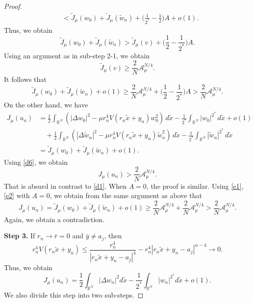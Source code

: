 \documentclass[10pt,a4paper]{amsart}
\numberwithin{equation}{section}
\begin{document}
\begin{proof}
\begin{align*}
 &<\tilde{J}_\mu(w_0)+\tilde{J}_\mu( \tilde{w}_n)
  +\Big( \frac{1}{2^*}-\frac{1}{2}\Big) A+o(1).
 \end{align*}
Thus, we obtain
\[
 \tilde{J}_\mu(w_0)+\tilde{J}_\mu( \tilde{w}_n)>\tilde{J}_\mu(v)
 + \Big( \frac{1}{2}-\frac{1}{2^*}\Big) A.
 \]
Using an argument as in sub-step 2-1, we obtain
\[
 \tilde{J}_\mu(v)\geq \frac{2}{N}\mathcal{A}_{\mu}^{N/4}.
\]
It follows that
\begin{equation}\label{d6}
 \tilde{J}_\mu(w_0)+\tilde{J}_\mu( \tilde{w}_n)+o(1)
 \geq \frac{2}{N}\mathcal{A}_{\mu}^{N/4}
 + \Big( \frac{1}{2}-\frac{1}{2^*}\Big) A> \frac{2}{N}\mathcal{A}_{\mu}^{N/4}.
\end{equation}
On the other hand, we have
 \begin{align*}
 J_\mu(u_n)
 &=\frac{1}{2}\int_{\mathbb{R}^N}\left(|\Delta w_0|^2-\mu r_n^4V(r_n\tilde{x}+y_n)w_0^2\right)\,d\tilde{x}-\frac{1}{2^*}\int _{\mathbb{R}^N}|w_0|^{2^*}\,d\tilde{x}+o(1)\\
 &\quad +\frac{1}{2}\int_{\mathbb{R}^N}\left(|\Delta \tilde{w}_n|^2-\mu r_n^4V(r_n\tilde{x}+y_n) \tilde{w}_n^2\right)\,d\tilde{x}-\frac{1}{2^*}\int _{\mathbb{R}^N}| \tilde{w}_n|^{2^*}\,d\tilde{x}\\
 &=\tilde{J}_\mu(w_0)+\tilde{J}_\mu( \tilde{w}_n)+o(1).
 \end{align*}
 Using \eqref{d6}, we obtain
 \[
 J_\mu(u_n)> \frac{2}{N}\mathcal{A}_{\mu}^{N/4}.
 \]
 That is absurd in contrast to \eqref{d1}. When $A=0$, the proof is similar. 
 Using \eqref{e1}, \eqref{e2} with $A=0$, we obtain from the same argument as 
 above that
 \[
 J_\mu(u_n)=\tilde{J}_\mu(w_0)+\tilde{J}_\mu( \tilde{w}_n)+o(1)\geq \frac{2}{N}\mathcal{A}_{\mu}^{N/4}+\frac{2}{N}\mathcal{A}_{\mu}^{N/4}>\frac{2}{N}\mathcal{A}_{\mu}^{N/4}.
 \]
Again, we obtain a contradiction. 
\smallskip

\noindent\textbf{Step 3.} If \(r_n\to \bar{r}=0\) and \(\bar {y}\neq a_j\), then
\[
 r_n^4V(r_n\tilde{x}+y_n)\leq \frac{r_n^4}{\left|r_n\tilde{x}
 +y_n-a_j\right| ^4 }-r_n^4\left|r_n\tilde{x}+y_n-a_j\right|^{\alpha-4}\to 0.
 \]
Thus, we obtain
\begin{equation}\label{b1}
 J_\mu(u_n)=\frac{1}{2}\int_{\mathbb{R}^N}|\Delta {w}_n|^2d\tilde{x}
 -\frac{1}{2^*}\int _{\mathbb{R}^N}|{w}_n|^{2^*}d\tilde{x}+o(1).
\end{equation}
We also divide this step into two sub-steps.
\smallskip


\end{proof}
\end{document}
